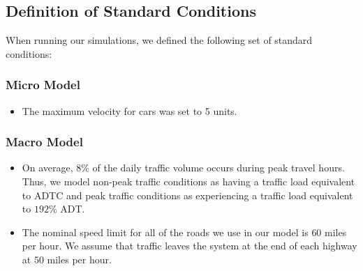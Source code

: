 \subsection{Definition of Standard Conditions}
When running our simulations, we defined the following set of standard conditions:

\subsubsection{Micro Model}
\begin{itemize}
\item The maximum velocity for cars was set to 5 units.
\end{itemize}

\subsubsection{Macro Model}
\begin{itemize}
\item On average, $8\%$ of the daily traffic volume occurs during peak travel hours. Thus, we model non-peak traffic conditions as having a traffic load equivalent to ADTC and peak traffic conditions as experiencing a traffic load equivalent to $192\%$ ADT.
\item The nominal speed limit for all of the roads we use in our model is $60$ miles per hour. We assume that traffic leaves the system at the end of each highway at $50$ miles per hour.
\end{itemize}


